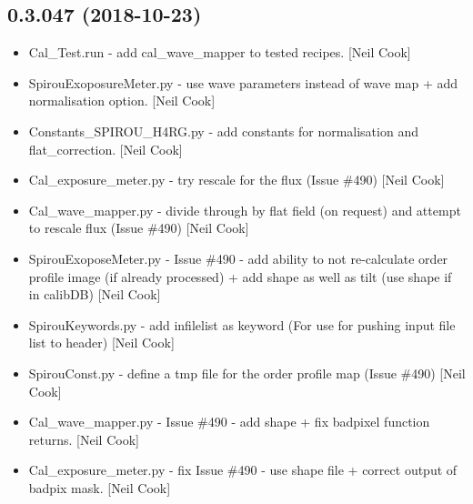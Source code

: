 \documentclass[a4paper,10pt,english]{report}
\begin{document}
\subsection{0.3.047 (2018-10-23)}
\label{\detokenize{misc/changelog:id283}}\begin{itemize}
\item {} 
Cal\_Test.run - add cal\_wave\_mapper to tested recipes. {[}Neil Cook{]}

\item {} 
SpirouExoposureMeter.py - use wave parameters instead of wave map +
add normalisation option. {[}Neil Cook{]}

\item {} 
Constants\_SPIROU\_H4RG.py - add constants for normalisation and
flat\_correction. {[}Neil Cook{]}

\item {} 
Cal\_exposure\_meter.py - try rescale for the flux (Issue \#490) {[}Neil
Cook{]}

\item {} 
Cal\_wave\_mapper.py - divide through by flat field (on request) and
attempt to rescale flux (Issue \#490) {[}Neil Cook{]}

\item {} 
SpirouExoposeMeter.py - Issue \#490 - add ability to not re-calculate
order profile image (if already processed) + add shape as well as tilt
(use shape if in calibDB) {[}Neil Cook{]}

\item {} 
SpirouKeywords.py - add infilelist as keyword (For use for pushing
input file list to header) {[}Neil Cook{]}

\item {} 
SpirouConst.py - define a tmp file for the order profile map (Issue
\#490) {[}Neil Cook{]}

\item {} 
Cal\_wave\_mapper.py - Issue \#490 - add shape + fix badpixel function
returns. {[}Neil Cook{]}

\item {} 
Cal\_exposure\_meter.py - fix Issue \#490 - use shape file + correct
output of badpix mask. {[}Neil Cook{]}

\end{itemize}
\end{document}
